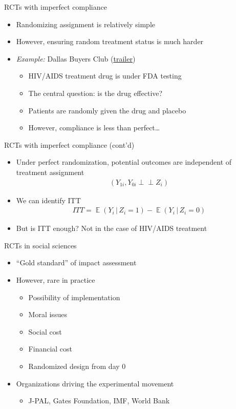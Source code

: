 \documentclass[aspectratio=169,compress,handout,t,xcolor=table]{beamer}
\DeclareMathOperator{\E}{\mathbb{E}}                       %
\providecommand{\indep}{\perp \!\!\!\! \perp}              %
\begin{document}
\begin{frame}{RCTs with imperfect compliance}
  \begin{itemize}
    \item Randomizing assignment is relatively simple
    \item However, ensuring random treatment status is much harder
    \item \emph{Example:} Dallas Buyers Club (\href{https://youtu.be/ety5kOjlXoU}{\color{blue}\underline{trailer}})
    \begin{itemize}
      \item HIV/AIDS treatment drug is under FDA testing
      \item The central question: is the drug effective?
      \item Patients are randomly given the drug and placebo
      \item However, compliance is less than perfect\ldots
    \end{itemize}
  \end{itemize}
\end{frame}

\begin{frame}{RCTs with imperfect compliance (cont'd)}
  \begin{itemize}
    \item Under perfect randomization, potential outcomes are independent of treatment assignment
    \begin{align*}
      (Y_{1i}, Y_{0i} \indep Z_i)
    \end{align*}
    \item We can identify ITT
    \begin{align*}
      ITT = \E(Y_{i} \,|\, Z_i=1) - \E(Y_{i} \,|\, Z_i=0)
    \end{align*}
    \item But is ITT enough? Not in the case of HIV/AIDS treatment
  \end{itemize}
\end{frame}

\begin{frame}{RCTs in social sciences}
  \begin{itemize}
    \item ``Gold standard'' of impact assessment
    \item However, rare in practice
    \begin{itemize}
      \item Possibility of implementation
      \item Moral issues
      \item Social cost
      \item Financial cost
      \item Randomized design from day 0
    \end{itemize}
    \item Organizations driving the experimental movement
    \begin{itemize}
      \item J-PAL, Gates Foundation, IMF, World Bank
    \end{itemize}
  \end{itemize}
\end{frame}
\end{document}
